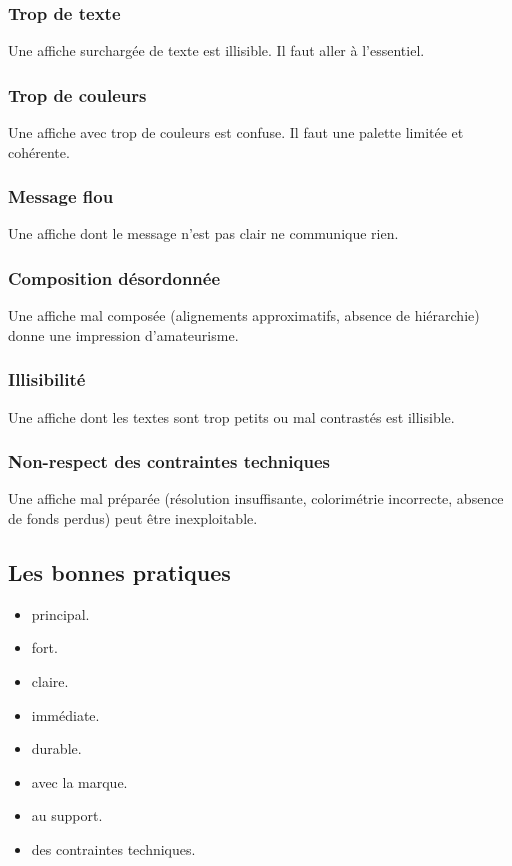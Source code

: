 \subsubsection{Trop de texte}

Une affiche surchargée de texte est illisible. Il faut aller à l'essentiel.

\subsubsection{Trop de couleurs}

Une affiche avec trop de couleurs est confuse. Il faut une palette limitée et cohérente.

\subsubsection{Message flou}

Une affiche dont le message n'est pas clair ne communique rien.

\subsubsection{Composition désordonnée}

Une affiche mal composée (alignements approximatifs, absence de hiérarchie) donne une impression d'amateurisme.

\subsubsection{Illisibilité}

Une affiche dont les textes sont trop petits ou mal contrastés est illisible.

\subsubsection{Non-respect des contraintes techniques}

Une affiche mal préparée (résolution insuffisante, colorimétrie incorrecte, absence de fonds perdus) peut être inexploitable.

\subsection{Les bonnes pratiques}

\begin{itemize}
    \item {} principal.
    \item {} fort.
    \item {} claire.
    \item {} immédiate.
    \item {} durable.
    \item {} avec la marque.
    \item {} au support.
    \item {} des contraintes techniques.
\end{itemize}


